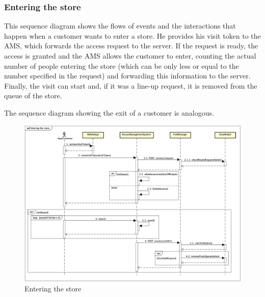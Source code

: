 \documentclass[a4paper,oneside,11pt]{book}
\begin{document}
    \subsubsection{Entering the store}
    This sequence diagram shows the flows of events and the interactions that happen when a customer wants to enter a store. He provides his visit token to the AMS, which forwards the access request to the server. If the request is ready, the access is granted and the AMS allows the customer to enter, counting the actual number of people entering the store (which can be only less or equal to the number specified in the request) and forwarding this information to the server. Finally, the visit can start and, if it was a line-up request, it is removed from the queue of the store. \par
    The sequence diagram showing the exit of a customer is analogous.
    \begin{figure}[H]
        \centering
        \includegraphics[width=\textwidth, height=\textheight, keepaspectratio]{pictures/sequence_diagrams/entering_the_store}
        \caption{Entering the store}
        \label{figure:entering_the_store}
    \end{figure}
    \newpage
\end{document}
